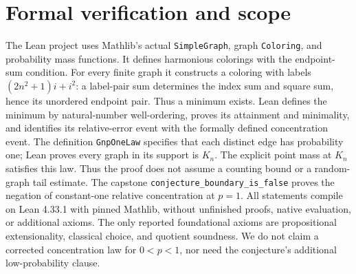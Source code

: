 \documentclass[10pt]{article}
\begin{document}
\section*{Formal verification and scope}
The Lean project uses Mathlib's actual \texttt{SimpleGraph}, graph
\texttt{Coloring}, and probability mass functions. It defines harmonious
colorings with the endpoint-sum condition. For every finite graph it
constructs a coloring with labels $(2n^2+1)i+i^2$: a label-pair sum determines
the index sum and square sum, hence its unordered endpoint pair. Thus a
minimum exists. Lean defines the minimum by natural-number well-ordering,
proves its attainment and minimality, and identifies its relative-error
event with the formally defined concentration event.
The definition \texttt{GnpOneLaw} specifies that each distinct edge has
probability one; Lean proves every graph in its support is $K_n$.
The explicit point mass at $K_n$ satisfies this law. Thus the proof does
not assume a counting bound or a random-graph tail estimate.
The capstone \texttt{conjecture\_boundary\_is\_false} proves the negation
of constant-one relative concentration at $p=1$. All statements compile
on Lean 4.33.1 with pinned Mathlib, without unfinished proofs, native
evaluation, or additional axioms. The only reported foundational axioms
are propositional extensionality, classical choice, and quotient soundness.
We do not claim a corrected concentration law for $0<p<1$, nor need the
conjecture's additional low-probability clause.
\end{document}

